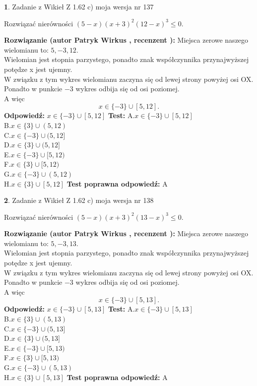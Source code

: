 \documentclass[12pt, a4paper]{article}
\theoremstyle{definition} %
\newtheorem{zad}{}
\newcommand{\zadStart}[1]{\begin{zad}#1\newline}
\newcommand{\zadStop}{\end{zad}}
\newcommand{\rozwStart}[2]{\noindent \textbf{Rozwiązanie (autor #1 , recenzent #2): }\newline}
\newcommand{\rozwStop}{\newline}
\newcommand{\odpStart}{\noindent \textbf{Odpowiedź:}\newline}
\newcommand{\odpStop}{\newline}
\newcommand{\testStart}{\noindent \textbf{Test:}\newline}
\newcommand{\testStop}{\newline}
\newcommand{\kluczStart}{\noindent \textbf{Test poprawna odpowiedź:}\newline}
\newcommand{\kluczStop}{\newline}
\begin{document}
\zadStart{Zadanie z Wikieł Z 1.62 c) moja wersja nr 137}

Rozwiązać nierówności $(5-x)(x+3)^{2}(12-x)^{3}\le0$.
\zadStop
\rozwStart{Patryk Wirkus}{}
Miejsca zerowe naszego wielomianu to: $5, -3, 12$.\\
Wielomian jest stopnia parzystego, ponadto znak współczynnika przy\linebreak najwyższej potędze x jest ujemny.\\ W związku z tym wykres wielomianu zaczyna się od lewej strony powyżej osi OX.\\
Ponadto w punkcie $-3$ wykres odbija się od osi poziomej.\\
A więc $$x \in \{-3\} \cup [5,12].$$
\rozwStop
\odpStart
$x \in \{-3\} \cup [5,12]$
\odpStop
\testStart
A.$x \in \{-3\} \cup [5,12]$\\
B.$x \in \{3\} \cup (5,12)$\\
C.$x \in \{-3\} \cup (5,12]$\\
D.$x \in \{3\} \cup (5,12]$\\
E.$x \in \{-3\} \cup [5,12)$\\
F.$x \in \{3\} \cup [5,12)$\\
G.$x \in \{-3\} \cup (5,12)$\\
H.$x \in \{3\} \cup [5,12]$
\testStop
\kluczStart
A
\kluczStop



\zadStart{Zadanie z Wikieł Z 1.62 c) moja wersja nr 138}

Rozwiązać nierówności $(5-x)(x+3)^{2}(13-x)^{3}\le0$.
\zadStop
\rozwStart{Patryk Wirkus}{}
Miejsca zerowe naszego wielomianu to: $5, -3, 13$.\\
Wielomian jest stopnia parzystego, ponadto znak współczynnika przy\linebreak najwyższej potędze x jest ujemny.\\ W związku z tym wykres wielomianu zaczyna się od lewej strony powyżej osi OX.\\
Ponadto w punkcie $-3$ wykres odbija się od osi poziomej.\\
A więc $$x \in \{-3\} \cup [5,13].$$
\rozwStop
\odpStart
$x \in \{-3\} \cup [5,13]$
\odpStop
\testStart
A.$x \in \{-3\} \cup [5,13]$\\
B.$x \in \{3\} \cup (5,13)$\\
C.$x \in \{-3\} \cup (5,13]$\\
D.$x \in \{3\} \cup (5,13]$\\
E.$x \in \{-3\} \cup [5,13)$\\
F.$x \in \{3\} \cup [5,13)$\\
G.$x \in \{-3\} \cup (5,13)$\\
H.$x \in \{3\} \cup [5,13]$
\testStop
\kluczStart
A
\kluczStop
\end{document}
